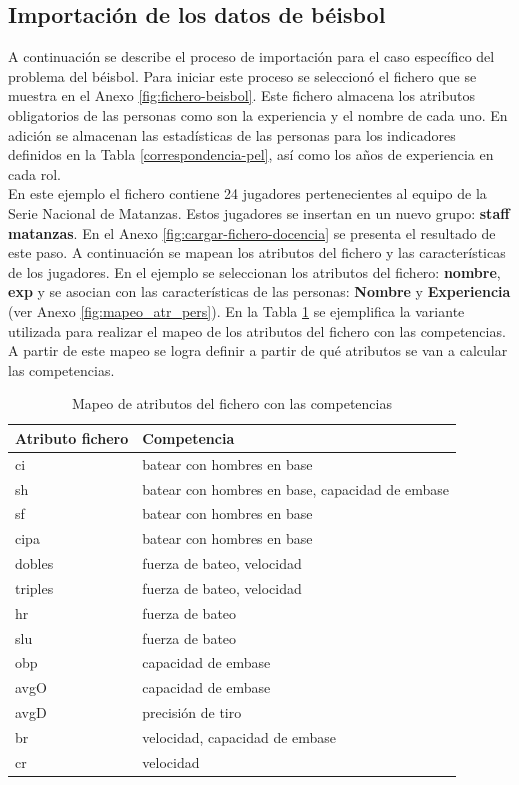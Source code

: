\subsection{Importación de los datos de  béisbol} \label{sec:impo_beisbol}
A continuación se describe el proceso de importación para el caso específico del problema del béisbol. Para iniciar este proceso se seleccionó el fichero que se muestra en el Anexo \ref{fig:fichero-beisbol}. Este fichero almacena los atributos obligatorios de las personas como son la experiencia y el nombre de cada uno. En adición se almacenan las estadísticas de las personas para los indicadores definidos en la Tabla \ref{correspondencia-pel}, así como los años de experiencia en cada rol.\\

En este ejemplo el fichero contiene 24 jugadores pertenecientes al equipo de la Serie Nacional de Matanzas. Estos jugadores se insertan en un nuevo grupo: \textbf{staff matanzas}. En el Anexo \ref{fig:cargar-fichero-docencia} se presenta el resultado de este paso. A continuación se mapean los atributos del fichero y las características de los jugadores. En el ejemplo se seleccionan los atributos del fichero: \textbf{nombre}, \textbf{exp} y se asocian con las características de las personas: \textbf{Nombre} y \textbf{Experiencia} (ver Anexo \ref{fig:mapeo_atr_pers}). En la Tabla \ref{table:mapeo_competencias_beisbol} se ejemplifica la variante utilizada para realizar el mapeo de los atributos del fichero con las competencias. A partir de este mapeo se logra definir a partir de qué atributos se van a calcular las competencias. \\

\begin{table}[H]
	\centering
	\caption{Mapeo de atributos del fichero con las competencias}\label{table:mapeo_competencias_beisbol}
		\begin{tabular} {l | p{6cm}}
			\toprule
			\textbf{Atributo fichero} & \textbf{Competencia} \\ \midrule
			ci & batear con hombres en base \\ \hline
			 sh&   batear con hombres en base, capacidad de embase \\ \hline
			sf &  batear con hombres en base \\ \hline
			cipa &   batear con hombres en base\\ \hline
			dobles &  fuerza de bateo, velocidad \\ \hline
			triples & fuerza de bateo, velocidad  \\ \hline
			hr &   fuerza de bateo\\ \hline
			slu &   fuerza de bateo\\ \hline
			obp & capacidad de embase  \\ \hline
			avgO & capacidad de embase   \\ \hline
			avgD & precisión de tiro \\ \hline
			br &  velocidad, capacidad de embase \\ \hline
			cr &   velocidad \\ \bottomrule
		\end{tabular}
\end{table}

